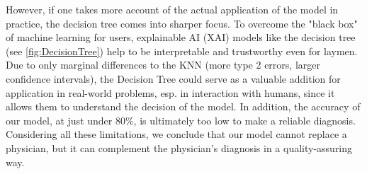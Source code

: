 However, if one takes more account of the actual application of the model in practice, the decision tree comes into sharper focus. To overcome the "black box" of machine learning for users, explainable AI (XAI) models like the decision tree (see \cref{fig:DecisionTree}) help to be interpretable and trustworthy even for laymen. Due to only marginal differences to the KNN (more type 2 errors, larger confidence intervals), the Decision Tree could serve as a valuable addition for application in real-world problems, esp. in interaction with humans, since it allows them to understand the decision of the model. In addition, the accuracy of our model, at just under 80\%, is ultimately too low to make a reliable diagnosis. Considering all these limitations, we conclude that our model cannot replace a physician, but it can complement the physician's diagnosis in a quality-assuring way. 


